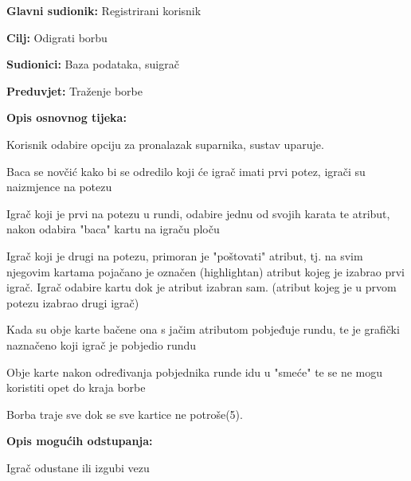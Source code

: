 				\newpage
				\noindent {}
				\begin{packed_item}
					
					\item \textbf{Glavni sudionik: }Registrirani korisnik
					\item  \textbf{Cilj:} Odigrati borbu
					\item  \textbf{Sudionici:} Baza podataka, suigrač
					\item  \textbf{Preduvjet:} Traženje borbe
					\item  \textbf{Opis osnovnog tijeka:}
					
					\item[] \begin{packed_enum}
						
						\item Korisnik odabire opciju za pronalazak suparnika, sustav uparuje.
						\item Baca se novčić kako bi se odredilo koji će igrač imati prvi potez, igrači su naizmjence na potezu
						\item Igrač koji je prvi na potezu u rundi, odabire jednu od svojih karata te atribut, nakon odabira "baca" kartu na igraču ploču
						\item Igrač koji je drugi na potezu, primoran je "poštovati" atribut, tj. na svim njegovim kartama pojačano je označen (highlightan) atribut kojeg je izabrao prvi igrač. Igrač odabire kartu dok je atribut izabran sam. (atribut kojeg je u prvom potezu izabrao drugi igrač)
						\item Kada su obje karte bačene ona s jačim atributom pobjeđuje rundu, te je grafički naznačeno koji igrač je pobjedio rundu
						\item Obje karte nakon određivanja pobjednika runde idu u "smeće" te se ne mogu koristiti opet do kraja borbe
						\item Borba traje sve dok se sve kartice ne potroše(5).
					\end{packed_enum}
					
					\item  \textbf{Opis mogućih odstupanja:}
					
					\item[] \begin{packed_item}
						
						\item[1.a] Igrač odustane ili izgubi vezu
						\item[] \begin{packed_enum}
							

\end{packed_enum}
\end{packed_item}
\end{packed_item}

